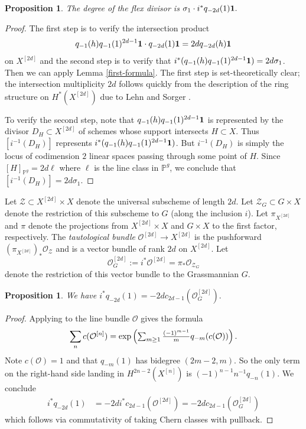 \documentclass{amsart}
\newtheorem{proposition}[theorem]{Proposition}
\theoremstyle{definition}
\begin{document}
\begin{proposition}\label{int-lemma} The degree of the flex divisor is
  $\sigma_1\cdot i^*q_{-2d}(1){\bf 1}.$ \end{proposition}

\begin{proof} The first step is to verify the intersection
product $$q_{-1}(h)q_{-1}(1)^{2d-1}{\bf 1}\cdot q_{-2d}(1){\bf 1}   =2dq_{-2d}(h){\bf 1}$$
on $X^{[2d]}$ and the second step is to verify that
$i^*(q_{-1}(h)q_{-1}(1)^{2d-1}{\bf 1})=2d\sigma_1$. Then we can
apply Lemma \ref{first-formula}. The first step is
set-theoretically clear; the intersection multiplicity $2d$
follows quickly from the description of the ring structure on
$H^*(X^{[2d]})$ due to Lehn and Sorger \cite[Thm.~1.1 and Prop.~2.13]{lehn2003cup}.

To verify the second step, note that 
$q_{-1}(h)q_{-1}(1)^{2d-1}{\bf 1}$ is represented by
the divisor $D_H\subset X^{[2d]}$
of schemes whose support intersects $H\subset X$.
Thus $[i^{-1}(D_H)]$ represents $i^*(q_{-1}(h)q_{-1}(1)^{2d-1}{\bf 1})$.
But $i^{-1}(D_H)$ is simply the locus of codimension $2$
linear spaces passing through some point of $H$.
Since $[H]_{\mathbb{P}^g}=2d\ell$ where $\ell$
is the line class in $\mathbb{P}^g$, we conclude that
$[i^{-1}(D_H)]=2d\sigma_1$.
\end{proof}


Let $\mathcal{Z}\subset X^{[2d]}\times X$ denote the universal subscheme of length $2d$.
Let $\mathcal{Z}_G\subset G\times X$
denote the restriction of this subscheme to $G$ (along the inclusion $i$). Let $\pi_{X^{[2d]}}$ and $\pi$
denote the projections from $X^{[2d]}\times X$ and $G\times X$ to the first factor, respectively.
The {\it tautological bundle} $\mathcal{O}^{[2d]}\to X^{[2d]}$
is the pushforward $(\pi_{X^{[2d]}})_*\mathcal{O}_{\mathcal{Z}}$ and is a vector bundle
of rank $2d$ on $X^{[2d]}$. Let
$$\mathcal{O}^{[2d]}_G:=i^*\mathcal{O}^{[2d]}=\pi_*\mathcal{O}_{\mathcal{Z}_G}$$
denote the restriction of  this vector bundle to the Grassmannian $G$.

\begin{proposition}\label{int-lemma2}
We have $i^*q_{-2d}(1)=-2dc_{2d-1}(\mathcal{O}_G^{[2d]}).$ \end{proposition}

\begin{proof} Applying \cite[Thm.~12.4]{ellingsrud2000hilbert} 
to the line bundle $\mathcal{O}$ gives the formula
$$\sum_n c(\mathcal{O}^{[n]}) = {\rm exp}
\left(\textstyle\sum_{m\geq 1} \frac{(-1)^{m-1}}{m}q_{-m}(c(\mathcal{O}))\right).$$
Note $c(\mathcal{O})=1$ and that $q_{-m}(1)$ has bidegree $(2m-2, m)$.
So the only term on the right-hand side landing in $H^{2n-2}(X^{[n]})$
is $(-1)^{n-1}n^{-1}q_{-n}(1)$. We conclude \begin{align*}
i^*q_{-2d}(1)&=-2di^*c_{2d-1}(\mathcal{O}^{[2d]})=-2dc_{2d-1}(\mathcal{O}_G^{[2d]}) \end{align*}
which follows via commutativity of taking Chern classes with pullback.  \end{proof}
\end{document}
